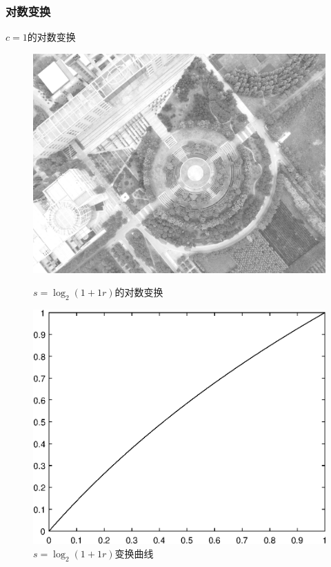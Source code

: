 \subsubsection{对数变换}
$c=1$的对数变换
\begin{figure}[H]
	\centering
	\begin{minipage}{0.45\linewidth}
		\includegraphics[width=\linewidth]{figure/DJI_0027_Log_100.png}
		\caption{$s=\log_2(1+1r)$的对数变换}
	\end{minipage}
	\begin{minipage}{0.45\linewidth}
		\includegraphics[width=\linewidth]{figure/DJI_0027_Log_100_Graph.eps}
		\caption{$s=\log_2(1+1r)$变换曲线}
	\end{minipage}
\end{figure}

